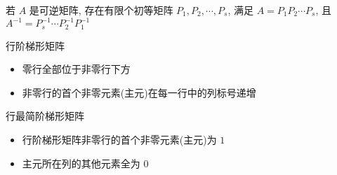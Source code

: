\begin{corollary}[矩阵变换]
	若 $A$ 是可逆矩阵, 存在有限个初等矩阵 $P_{1},P_{2},\cdots,P_{s}$, 满足 $A = P_{1}P_{2}\cdots P_{s}$, 且 $A^{-1} = P_{s}^{-1}\cdots P_{2}^{-1}P_{1}^{-1}$
\end{corollary}

\begin{definition}[行阶梯形矩阵]
	\textcolor{purplec}{行阶梯形矩阵}
	\begin{itemize}
		\item 零行全部位于非零行下方
		\item 非零行的首个非零元素(主元)在每一行中的列标号递增
	\end{itemize}

	\textcolor{purplec}{行最简阶梯形矩阵}
	\begin{itemize}
		\item 行阶梯形矩阵非零行的首个非零元素(主元)为 $1$
		\item 主元所在列的其他元素全为 $0$
	\end{itemize}
\end{definition}

